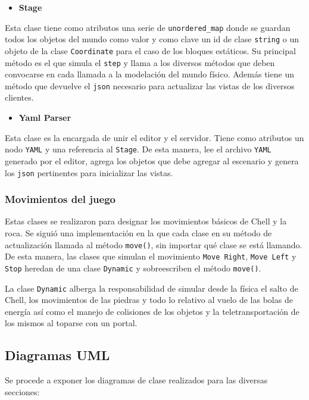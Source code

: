 \documentclass[a4paper]{article}
\begin{document}
\begin{itemize}
	\item \textbf{Stage}
\end{itemize}

Esta clase tiene como atributos una serie de \texttt{unordered\_map} donde se guardan todos los objetos del mundo como valor y como clave un id de clase \texttt{string} o un objeto de la clase \texttt{Coordinate} para el caso de los bloques estáticos. Su principal método es el que simula el \texttt{step} y llama a los diversos métodos que deben convocarse en cada llamada a la modelación del mundo físico. Además tiene un método que devuelve el \texttt{json} necesario para actualizar las vistas de los diversos clientes.

\begin{itemize}
	\item \textbf{Yaml Parser}
\end{itemize}
Esta clase es la encargada de unir el editor y el servidor. Tiene como atributos un nodo \texttt{YAML} y una referencia al \texttt{Stage}. De esta manera, lee el archivo \texttt{YAML} generado por el editor, agrega los objetos que debe agregar al escenario y genera los \texttt{json} pertinentes para inicializar las vistas.

\subsubsection{Movimientos del juego}

Estas clases se realizaron para designar los movimientos básicos de Chell y la roca. Se siguió una implementación en la que cada clase en su método de actualización llamada al método \texttt{move()}, sin importar qué clase se está llamando. De esta manera, las clases que simulan el movimiento \texttt{Move Right}, \texttt{Move Left} y \texttt{Stop} heredan de una clase \texttt{Dynamic} y sobreescriben el método \texttt{move()}.

La clase \texttt{Dynamic} alberga la responsabilidad de simular desde la física el salto de Chell, los movimientos de las piedras y todo lo relativo al vuelo de las bolas de energía así como el manejo de colisiones de los objetos y la teletransportación de los mismos al toparse con un portal.

\subsection{Diagramas UML}

Se procede a exponer los diagramas de clase realizados para las diversas secciones:
\end{document}
